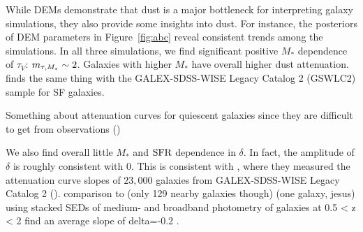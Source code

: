 

While DEMs demonstrate that dust is a major bottleneck for interpreting galaxy
simulations, they also provide some insights into dust. For instance, the
posteriors of DEM parameters in Figure~\ref{fig:abc} reveal consistent trends
among the simulations. In all three simulations, we find significant positive
$M_*$ dependence of $\tau_V$: $m_{\tau,M_*} \sim 2$. Galaxies with higher $M_*$ have
overall higher dust attenuation. 
\cite{salim2018} finds the same thing with the GALEX-SDSS-WISE Legacy Catalog 2
(GSWLC2) sample for SF galaxies. 


Something about attenuation curves for quiescent galaxies since they are
difficult to get from observations ()

We also find overall little $M_*$ and ${\rm SFR}$ dependence in $\delta$. In
fact, the amplitude of $\delta$ is roughly consistent with 0.  
This is consistent with \cite{salim2020}, where they measured the attenuation
curve slopes of $23,000$ galaxies from GALEX-SDSS-WISE Legacy Catalog 2
(). 
comparison to \cite{leja2017} (only 129 nearby galaxies though) 
\cite{viaene2017} (one galaxy, jesus)  
\cite{kriek2013}  using stacked SEDs of medium- and broadband photometry of
galaxies at 0.5 < z < 2 find an average slope of delta=-0.2 . %


